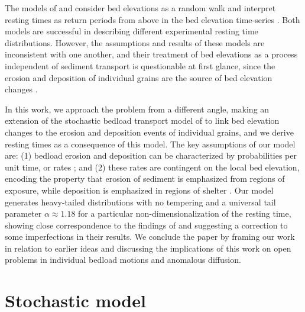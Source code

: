 \documentclass[draft]{agujournal2018}
\begin{document}
The models of \citet{Voepel2013} and \citet{Martin2014} consider bed elevations as a random walk and interpret resting times as return periods from above in the bed elevation time-series \citep[e.g.][]{Redner2007}.
Both models are successful in describing different experimental resting time distributions.
However, the assumptions and results of these models are inconsistent with one another, and their treatment of bed elevations as a process independent of sediment transport is questionable at first glance, since the erosion and deposition of individual grains are the source of bed elevation changes \citep[e.g.][]{Wong2007}.

In this work, we approach the problem from a different angle, making an extension of the stochastic bedload transport model of \citet{Ancey2008} to link bed elevation changes to the erosion and deposition events of individual grains, and we derive resting times as a consequence of this model.
The key assumptions of our model are: (1) bedload erosion and deposition can be characterized by probabilities per unit time, or rates \citep[e.g.][]{Einstein1950, Ancey2008}; and (2) these rates are contingent on the local bed elevation, encoding the property that erosion of sediment is emphasized from regions of exposure, while deposition is emphasized in regions of shelter \citep[e.g.][]{Sawai1987, Wong2007}.
Our model generates heavy-tailed distributions with no tempering and a universal tail parameter $\alpha \approx 1.18$ for a particular non-dimensionalization of the resting time, showing close correspondence to the findings of \citet{Martin2014} and suggesting a correction to some imperfections in their results.
We conclude the paper by framing our work in relation to earlier ideas and discussing the implications of this work on open problems in individual bedload motions and anomalous diffusion.

\section{Stochastic model}
\label{sec:theory}
\end{document}
